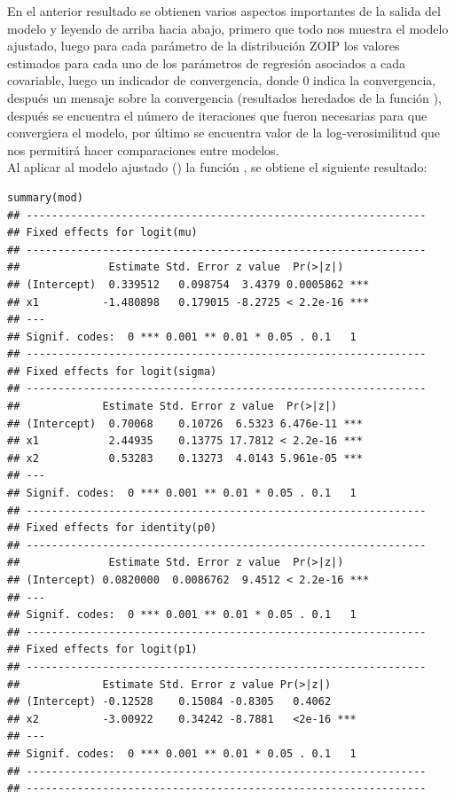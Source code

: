 En el anterior resultado se obtienen varios aspectos importantes de la salida del modelo y leyendo de arriba hacia abajo, primero que todo nos muestra el modelo ajustado, luego para cada par\'{a}metro de la distribuci\'{o}n ZOIP los valores estimados para cada uno de los pa\-r\'{a}\-me\-tros de regresi\'{o}n asociados a cada covariable, luego un indicador de convergencia, donde 0 indica la convergencia, despu\'{e}s un mensaje sobre la convergencia (resultados heredados de la funci\'{o}n ), despu\'{e}s se encuentra el n\'{u}mero de iteraciones que fueron necesarias para que convergiera el modelo, por \'{u}ltimo se encuentra valor de la log-verosimilitud que nos permitir\'{a} hacer comparaciones entre modelos.\\ 

 Al aplicar al modelo ajustado () la funci\'{o}n , se obtiene el siguiente resultado:

\begin{verbatim}
summary(mod)
## ---------------------------------------------------------------
## Fixed effects for logit(mu) 
## ---------------------------------------------------------------
##              Estimate Std. Error z value  Pr(>|z|)    
## (Intercept)  0.339512   0.098754  3.4379 0.0005862 ***
## x1          -1.480898   0.179015 -8.2725 < 2.2e-16 ***
## ---
## Signif. codes:  0 *** 0.001 ** 0.01 * 0.05 . 0.1   1
## ---------------------------------------------------------------
## Fixed effects for logit(sigma) 
## ---------------------------------------------------------------
##             Estimate Std. Error z value  Pr(>|z|)    
## (Intercept)  0.70068    0.10726  6.5323 6.476e-11 ***
## x1           2.44935    0.13775 17.7812 < 2.2e-16 ***
## x2           0.53283    0.13273  4.0143 5.961e-05 ***
## ---
## Signif. codes:  0 *** 0.001 ** 0.01 * 0.05 . 0.1   1
## ---------------------------------------------------------------
## Fixed effects for identity(p0) 
## ---------------------------------------------------------------
##              Estimate Std. Error z value  Pr(>|z|)    
## (Intercept) 0.0820000  0.0086762  9.4512 < 2.2e-16 ***
## ---
## Signif. codes:  0 *** 0.001 ** 0.01 * 0.05 . 0.1   1
## ---------------------------------------------------------------
## Fixed effects for logit(p1) 
## ---------------------------------------------------------------
##             Estimate Std. Error z value Pr(>|z|)    
## (Intercept) -0.12528    0.15084 -0.8305   0.4062    
## x2          -3.00922    0.34242 -8.7881   <2e-16 ***
## ---
## Signif. codes:  0 *** 0.001 ** 0.01 * 0.05 . 0.1   1
## ---------------------------------------------------------------
## ---------------------------------------------------------------
\end{verbatim}

